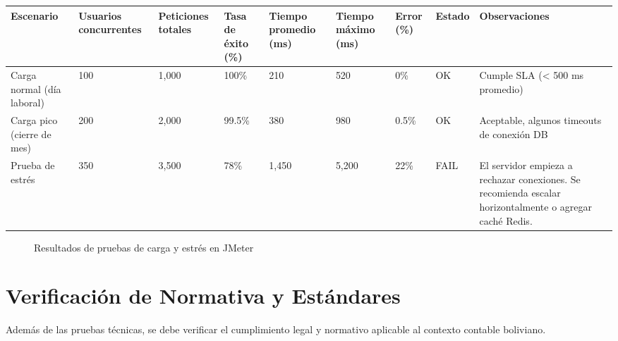 \documentclass[stu]{apa7}
\begin{document}
\begin{longtable}{|L{3cm}|C{2cm}|C{2cm}|C{2cm}|C{2cm}|C{2cm}|C{1.5cm}|L{3cm}|}
\hline
{}
\textbf{Escenario} & \textbf{Usuarios concurrentes} & \textbf{Peticiones totales} & \textbf{Tasa de éxito (\%)} & \textbf{Tiempo promedio (ms)} & \textbf{Tiempo máximo (ms)} & \textbf{Error (\%)} & \textbf{Estado} & \textbf{Observaciones} \\
\hline
Carga normal (día laboral) & 100 & 1,000 & 100\% & 210 & 520 & 0\% & OK & Cumple SLA (< 500 ms promedio) \\
\hline
Carga pico (cierre de mes) & 200 & 2,000 & 99.5\% & 380 & 980 & 0.5\% & OK & Aceptable, algunos timeouts de conexión DB \\
\hline
Prueba de estrés & 350 & 3,500 & 78\% & 1,450 & 5,200 & 22\% & FAIL & El servidor empieza a rechazar conexiones. Se recomienda escalar horizontalmente o agregar caché Redis. \\
\hline
\end{longtable}

\begin{figure}[H]
\centering
{}
\caption{Resultados de pruebas de carga y estrés en JMeter}
\end{figure}

\section{Verificación de Normativa y Estándares}

Además de las pruebas técnicas, se debe verificar el cumplimiento legal y normativo aplicable al contexto contable boliviano.
\end{document}
